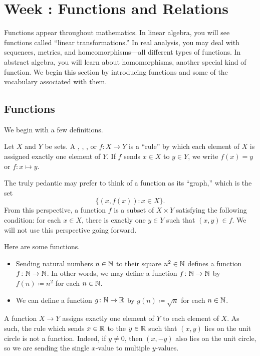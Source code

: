\documentclass[../notes.tex]{subfiles}
\begin{document}
\section{Week \theweek: Functions and Relations} \label{sec:relations}
Functions appear throughout mathematics. In linear algebra, you will see functions called ``linear transformations.'' In real analysis, you may deal with sequences, metrics, and homeomorphisms---all different types of functions. In abstract algebra, you will learn about homomorphisms, another special kind of function. We begin this section by introducing functions and some of the vocabulary associated with them.

\subsection{Functions}
We begin with a few definitions.
\begin{definition}[function]
    Let $X$ and $Y$ be sets. A , , , or  $f\colon X \to Y$ is a ``rule'' by which each element of $X$ is assigned exactly one element of $Y$. If $f$ sends $x \in X$ to $y\in Y$, we write $f(x) = y$ or $f\colon x \mapsto y$.
\end{definition}
\begin{remark}
    The truly pedantic may prefer to think of a function as its ``graph,'' which is the set
    \[\{(x,f(x)):x\in X\}.\]
    From this perspective, a function $f$ is a subset of $X\times Y$ satisfying the following condition: for each $x\in X$, there is exactly one $y\in Y$ such that $(x,y)\in f$. We will not use this perspective going forward.
\end{remark}
\begin{example}
    Here are some functions.
    \begin{itemize}
        \item Sending natural numbers $n\in\mathbb N$ to their square $n^2\in\mathbb N$ defines a function $f\colon\mathbb N\to\mathbb N$. In other words, we may define a function $f\colon\mathbb N\to\mathbb N$ by $f(n)\coloneqq n^2$ for each $n\in\mathbb N$.
        \item We can define a function $g\colon\mathbb N\to\mathbb R$ by $g(n)\coloneqq\sqrt n$ for each $n\in\mathbb N$.
    \end{itemize}
\end{example}
\begin{nex}
    A function $X \to Y$ assigns exactly one element of $Y$ to each element of $X$. As such, the rule which sends $x \in \mathbb R$ to the $y \in \mathbb R$ such that $(x, y)$ lies on the unit circle is not a function. Indeed, if $y \neq 0$, then $(x, -y)$ also lies on the unit circle, so we are sending the single $x$-value to multiple $y$-values.
\end{nex}
\end{document}
